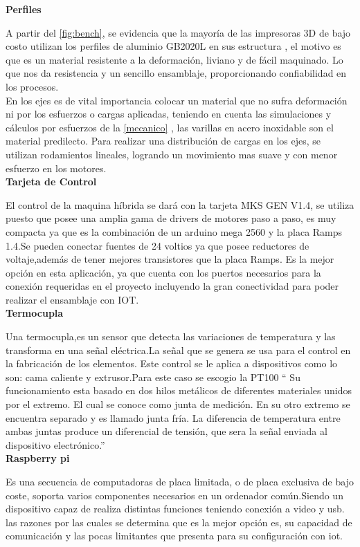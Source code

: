 \textbf{Perfiles}

 A partir del \ref{fig:bench}, se evidencia que la mayoría de las impresoras 3D de bajo costo utilizan los perfiles de aluminio GB2020L en sus estructura , el motivo es que es un material resistente a la deformación, liviano y de fácil maquinado. Lo que nos da resistencia y un sencillo ensamblaje, proporcionando confiabilidad en los procesos. \\
 En los ejes es de vital importancia colocar un material que no sufra deformación ni por los esfuerzos o cargas aplicadas, teniendo en cuenta las simulaciones y cálculos por esfuerzos de la \autoref{mecanico} , las varillas en acero inoxidable son el material predilecto. Para realizar una distribución de cargas en los ejes, se utilizan rodamientos lineales, logrando un movimiento mas suave y con menor esfuerzo en los motores. \\ 


\textbf{Tarjeta de Control}

El control de la maquina híbrida se dará con la tarjeta MKS GEN V1.4, se utiliza puesto que posee una amplia gama de drivers de motores paso a paso, es muy compacta ya que es la combinación de un arduino mega 2560 y la placa Ramps 1.4.Se pueden conectar fuentes de 24 voltios ya que posee reductores de voltaje,además de tener mejores transistores que la placa Ramps. Es la mejor opción en esta aplicación, ya que cuenta con  los puertos necesarios para la conexión requeridas en el proyecto incluyendo la gran conectividad para poder realizar el ensamblaje con IOT.\\

\textbf{Termocupla}

Una termocupla,es un sensor que detecta las variaciones de temperatura y las transforma en una señal eléctrica.La señal que se genera se usa para el control en la fabricación de los elementos. Este control se le aplica a dispositivos como lo son: cama caliente y extrusor.Para este caso se escogio la PT100  “ Su funcionamiento esta basado en dos hilos metálicos de diferentes materiales unidos por el extremo. El cual se conoce como junta de medición. En su otro extremo se encuentra separado y es llamado junta fría. La diferencia de temperatura entre ambas juntas produce un diferencial de tensión, que sera la señal enviada al dispositivo electrónico.''\citep{diseno} \\

\textbf{Raspberry pi}

Es una secuencia de computadoras de placa limitada, o de placa exclusiva de bajo coste, soporta varios componentes necesarios en un ordenador común.Siendo un dispositivo capaz de realiza distintas funciones teniendo conexión a video y usb. las razones por las cuales se determina que es la mejor opción es, su capacidad de comunicación y las pocas limitantes que presenta para su configuración con \acrshort{iot}.


